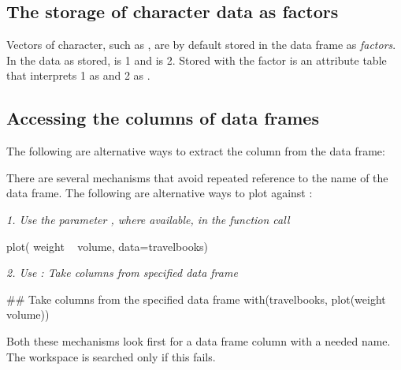 \subsection*{The storage of character data as factors}
Vectors of character, such as , are by default stored in
the data frame as {\em factors}.  In the data as stored,
 is 1 and  is 2. Stored with the factor
is an attribute table that interprets 1 as  and 2 as
.

\subsection*{Accessing the columns of data frames}

The following are alternative ways to extract the column
 from the data frame:
{\small
\begin{Schunk}
\end{Schunk}
}

There are several mechanisms that avoid repeated
reference to the name of the data frame.
The following are alternative ways to plot  against :
\begin{itemizz}
\item[]{\em 1. Use the parameter ,
where available, in
the function call}\\[-2pt]
\begin{Schunk}
\begin{Sinput}
plot( weight ~ volume, data=travelbooks)
\end{Sinput}
\end{Schunk}
\item[]{\em 2. Use : Take columns from specified
data frame}\\[-2pt]
\begin{Schunk}
\begin{Sinput}
## Take columns from the specified data frame
with(travelbooks, plot(weight ~ volume))
\end{Sinput}
\end{Schunk}
\vspace*{-3pt}

\noindent
\end{itemizz}
Both these mechanisms look first for a data frame column with a needed
name. The workspace is searched only if this fails.

